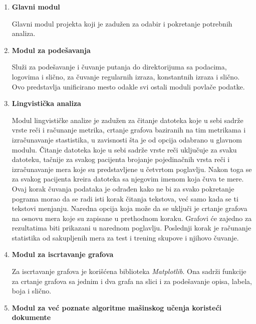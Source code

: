 \documentclass[12pt,oneside]{memoir}
\begin{document}
\begin{enumerate}
\item \textbf{Glavni modul}

Glavni modul projekta koji je zadužen za odabir i pokretanje potrebnih analiza.  

\item  \textbf{Modul za podešavanja}

Služi za podešavanje i čuvanje putanja do direktorijuma sa podacima, logovima i slično, za čuvanje regularnih izraza, konstantnih izraza i slično. Ovo predstavlja unificirano mesto odakle svi ostali moduli povlače podatke.

\item \textbf{Lingvistička analiza}

Modul lingvističke analize je zadužen za čitanje datoteka koje u sebi sadrže vrste reči i računanje metrika, crtanje grafova baziranih na tim metrikama i izračunavanje stastistika, u zavisnosti šta je od opcija odabrano u glavnom modulu. Čitanje datoteka koje u sebi sadrže vrste reči uključuje za svaku datoteku, tačnije za svakog pacijenta brojanje pojedinačnih vrsta reči i izračunavanje mera koje su predstavljene u četvrtom poglavlju. Nakon toga se za svakog pacijenta kreira datoteka sa njegovim imenom koja čuva te mere. Ovaj korak čuvanja podataka je odrađen kako ne bi za svako pokretanje pograma morao da se radi isti korak čitanja tekstova, već samo kada se ti tekstovi menjanju. Naredna opcija koja može da se uključi je crtanje grafova na osnovu mera koje su zapisane u prethodnom koraku. Grafovi će zajedno za rezultatima biti prikazani u narednom poglavlju. Poslednji korak je računanje statistika od sakupljenih mera za test i trening skupove i njihovo čuvanje.

\item \textbf{Modul za iscrtavanje grafova}

Za iscrtavanje grafova je korišćena biblioteka \textit{Matplotlib}. Ona sadrži funkcije za crtanje grafova sa jednim i dva grafa na slici i za podešavanje opisa, labela, boja i slično.

\item \textbf{Modul za već poznate algoritme mašinskog učenja koristeći dokumente}


\end{enumerate}
\end{document}
